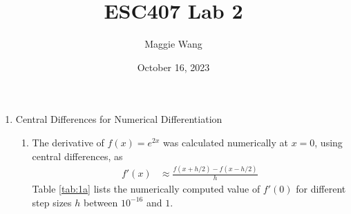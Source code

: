 \documentclass{article}
\begin{document}
\title{ESC407 Lab 2}

\author{Maggie Wang}

\date{October 16, 2023}
\maketitle

\begin{enumerate}
\item Central Differences for Numerical Differentiation
\begin{enumerate}
    \item The derivative of $f(x)=e^{2x}$ was calculated numerically at $x=0$, using central differences, as 
    \begin{align*}
        f'(x) &\approx \frac{f(x+h/2)-f(x-h/2)}{h}
    \end{align*}
    Table \ref{tab:1a} lists the numerically computed value of $f'(0)$ for different step sizes $h$ between $10^{-16}$ and $1$.
    


\end{enumerate}
\end{enumerate}
\end{document}
